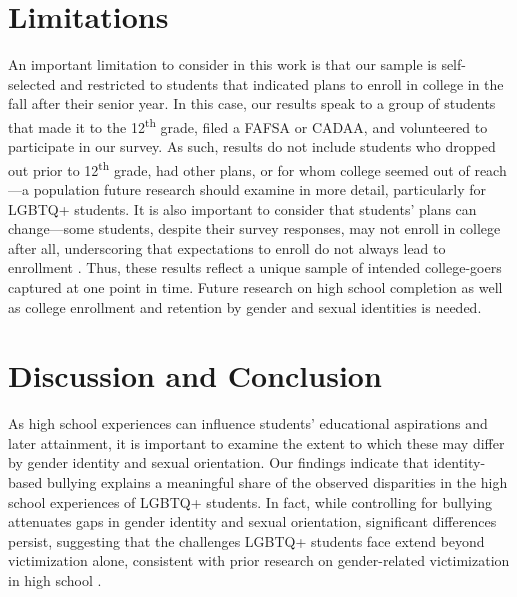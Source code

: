 \section{Limitations}\label{limitations}

An important limitation to consider in this work is that our sample is
self-selected and restricted to students that indicated plans to enroll
in college in the fall after their senior year. In this case, our
results speak to a group of students that made it to the 12\textsuperscript{th} grade,
filed a FAFSA or CADAA, and volunteered to participate in our survey. As
such, results do not include students who dropped out prior to 12\textsuperscript{th}
grade, had other plans, or for whom college seemed out of reach---a
population future research should examine in more detail, particularly
for LGBTQ+ students. It is also important to consider that students'
plans can change---some students, despite their survey responses, may
not enroll in college after all, underscoring that expectations to
enroll do not always lead to enrollment \citep{klasik2025a}. Thus,
these results reflect a unique sample of intended college-goers captured
at one point in time. Future research on high school completion as well
as college enrollment and retention by gender and sexual identities is
needed.

\section{Discussion and Conclusion}\label{discussion-and-conclusion}

As high school experiences can influence students' educational
aspirations and later attainment, it is important to examine the extent
to which these may differ by gender identity and sexual orientation. Our
findings indicate that identity-based bullying explains a meaningful
share of the observed disparities in the high school experiences of
LGBTQ+ students. In fact, while controlling for bullying attenuates gaps
in gender identity and sexual orientation, significant differences
persist, suggesting that the challenges LGBTQ+ students face extend
beyond victimization alone, consistent with prior research on
gender-related victimization in high school \citep{hatchel2018a, mcbride2021a}.

